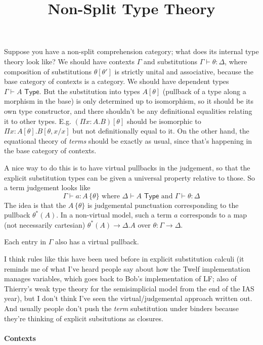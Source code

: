 \documentclass[10pt]{article}
\title{Non-Split Type Theory}
\author{}
\newcommand{\TYPE}{\,\,\mathsf{Type}}
\newcommand\vsubst[2]{#1 \, \{ #2 \}}
\begin{document}
\maketitle

Suppose you have a non-split comprehension category; what does its
internal type theory look like?  We should have contexts $\Gamma$ and
substitutions $\Gamma \vdash \theta : \Delta$, where composition of
substitutions $\theta[\theta']$ is strictly unital and associative,
because the base category of contexts is a category.  We should have
dependent types $\Gamma \vdash A \TYPE$.  But the substitution into
types $A[\theta]$ (pullback of a type along a morphism in the base) is
only determined up to isomorphism, so it should be its own type
constructor, and there shouldn't be any definitional equalities relating
it to other types.  E.g. $(\Pi x:A.B)[\theta]$ should be isomorphic to
$\Pi x:A[\theta].B[\theta,x/x]$ but not definitionally equal to it.
On the other hand, the equational theory of \emph{terms} should be
exactly as usual, since that's happening in the base category of
contexts.   

A nice way to do this is to have virtual pullbacks in the judgement, so
that the explicit substitution types can be given a universal property
relative to those.  So a term judgement looks like
\[
\Gamma \vdash a : \vsubst A \theta \text { where } \Delta \vdash A \TYPE
\text{ and } \Gamma \vdash \theta : \Delta
\]
The idea is that the $\vsubst A \theta$ is judgemental punctuation
corresponding to the pullback $\theta^*(A)$.  In a non-virtual model,
such a term $a$ corresponds to a map (not necessarily cartesian)
$\theta^*(A) \to \Delta.A$ over $\theta : \Gamma \to \Delta$.

Each entry in $\Gamma$ also has a virtual pullback.

I think rules like this have been used before in explicit substitution
calculi (it reminds me of what I've heard people say about how the Twelf
implementation manages variables, which goes back to Bob's
implementation of LF; also of Thierry's weak type theory for the
semisimplicial model from the end of the IAS year), but I don't think
I've seen the virtual/judgemental approach written out.  And usually
people don't push the \emph{term} substitution under binders because
they're thinking of explicit subsitutions as closures.

\paragraph{Contexts}
\end{document}
